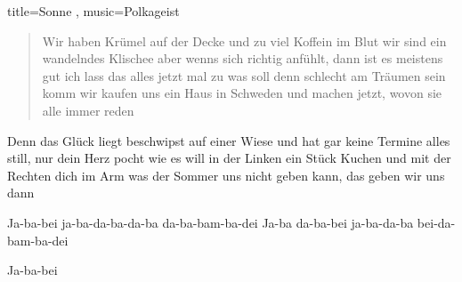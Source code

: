 \begin{song}{
	title={Sonne}
,	music={Polkageist}
}
\begin{verse}
Wir haben Krümel auf der Decke
und zu viel Koffein im Blut
wir sind ein wandelndes Klischee
aber wenns sich richtig anfühlt, dann ist es meistens gut
ich lass das alles jetzt mal zu
was soll denn schlecht am Träumen sein
komm wir kaufen uns ein Haus in Schweden
und machen jetzt, wovon sie alle immer reden
\end{verse}

\begin{chorus}
Denn das Glück liegt beschwipst auf einer Wiese
und hat gar keine Termine
alles still, nur dein Herz pocht wie es will
in der Linken ein Stück Kuchen
und mit der Rechten dich im Arm
was der Sommer uns nicht geben kann, das geben wir uns dann
\end{chorus}

Ja-ba-bei ja-ba-da-ba-da-ba da-ba-bam-ba-dei
Ja-ba da-ba-bei ja-ba-da-ba bei-da-bam-ba-dei

Ja-ba-bei
\end{song}

